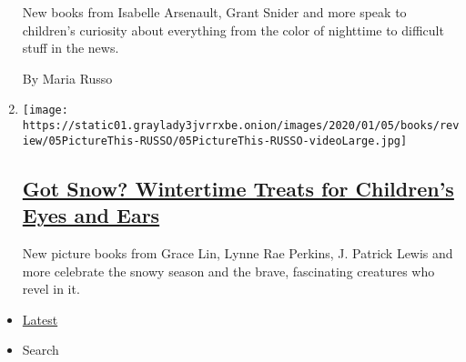 \begin{enumerate}
  New books from Isabelle Arsenault, Grant Snider and more speak to
  children's curiosity about everything from the color of nighttime to
  difficult stuff in the news.

  By Maria Russo
\item
  \texttt{[image: https://static01.graylady3jvrrxbe.onion/images/2020/01/05/books/review/05PictureThis-RUSSO/05PictureThis-RUSSO-videoLarge.jpg]}

  \hypertarget{got-snow-wintertime-treats-for-childrens-eyes-and-ears}{%
  \subsection{\texorpdfstring{\href{/2019/12/30/books/review/grace-lin-lynne-rae-perkins-j-patrick-lewis-snow-picture-books.html}{Got
  Snow? Wintertime Treats for Children's Eyes and
  Ears}}{Got Snow? Wintertime Treats for Children's Eyes and Ears}}\label{got-snow-wintertime-treats-for-childrens-eyes-and-ears}}

  New picture books from Grace Lin, Lynne Rae Perkins, J. Patrick Lewis
  and more celebrate the snowy season and the brave, fascinating
  creatures who revel in it.
\end{enumerate}

\begin{itemize}
\tightlist
\item
  \protect\hyperlink{stream-panel}{Latest}
\item
  Search
\end{itemize}

